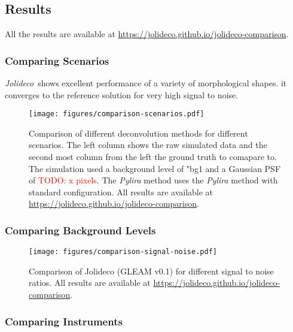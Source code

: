 \documentclass[twocolumn]{aastex631}
\newcommand{\jolideco}{\textit{Jolideco}~}
\newcommand{\todo}[1]{\textcolor{red}{TODO: #1}\PackageWarning{TODO:}{#1!}}
\begin{document}
    \subsection{Results}
    All the results are available at \url{https://jolideco.github.io/jolideco-comparison}.
    \subsubsection{Comparing Scenarios}
    \jolideco shows excellent performance of a variety of morphological shapes. 
    it converges to the reference solution for very high signal to noise.

    \begin{figure*}
        \begin{centering}
            \texttt{[image: figures/comparison-scenarios.pdf]}
            \caption{
                Comparison of different deconvolution methods for different scenarios. The left column shows the raw simulated data and the second most column from the left the ground truth to comapare to. The simulation used a background level of "bg1 and a Gaussian PSF of \todo{x pixels}. The \textit{Pylira} method uses the \textit{Pylira} method with standard configuration.
                All results are available at \url{https://jolideco.github.io/jolideco-comparison}.
            }
            \label{fig:comparison-scenarios}
        \end{centering}
    \end{figure*}

    \subsubsection{Comparing Background Levels}
       \begin{figure*}
        \begin{centering}
            \texttt{[image: figures/comparison-signal-noise.pdf]}
            \caption{
                Comparison of Jolideco (GLEAM v0.1) for different signal to noise ratios.
                All results are available at \url{https://jolideco.github.io/jolideco-comparison}.
            }
            \label{fig:comparison-signal-noise}
        \end{centering}
    \end{figure*}

    \subsubsection{Comparing Instruments}
\end{document}
